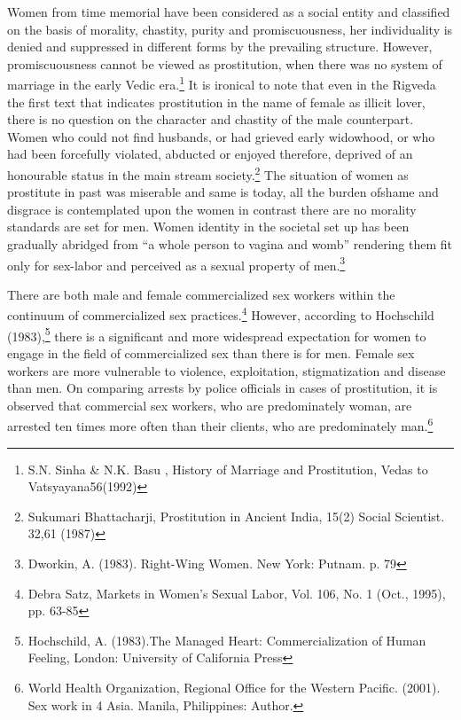 \begin{multicols}{2}
\vspace{-.15cm}


\vspace{-.1cm}

\noi
Women from time memorial have been considered as a social entity and classified on the basis
of morality, chastity, purity and promiscuousness, her individuality is denied and suppressed
in different forms by the prevailing structure. However, promiscuousness cannot be viewed as
prostitution, when there was no system of marriage in the early Vedic era.\footnote{S.N. Sinha \& N.K. Basu , History of Marriage and Prostitution, Vedas to Vatsyayana56(1992)} It is ironical to
note that even in the Rigveda the first text that indicates prostitution in the name of female as
illicit lover, there is no question on the character and chastity of the male counterpart. Women
who could not find husbands, or had grieved early widowhood, or who had been forcefully
violated, abducted or enjoyed therefore, deprived of an honourable status in the main stream
society.\footnote{Sukumari Bhattacharji, Prostitution in Ancient India, 15(2) Social Scientist. 32,61 (1987)} The situation of women as prostitute in past was miserable and same is today, all the
burden ofshame and disgrace is contemplated upon the women in contrast there are no morality
standards are set for men. Women identity in the societal set up has been gradually abridged
from “a whole person to vagina and womb” rendering them fit only for sex-labor and perceived
as a sexual property of men.\footnote{Dworkin, A. (1983). Right-Wing Women. New York: Putnam. p. 79}

\newpage

\noi
There are both male and female commercialized sex workers within the continuum of
commercialized sex practices.\footnote{Debra Satz, Markets in Women's Sexual Labor, Vol. 106, No. 1 (Oct., 1995), pp. 63-85} However, according to Hochschild (1983),\footnote{Hochschild, A. (1983).The Managed Heart: Commercialization of Human Feeling, London: University of
California Press} there is a significant and more widespread expectation for women to engage in the field of commercialized sex than there is for men. Female sex workers are more vulnerable to violence, exploitation, stigmatization and disease than men. On comparing arrests by police officials in cases of prostitution, it is observed that commercial sex workers, who are predominately woman, are arrested ten times more often than their clients, who are predominately man.\footnote{World Health Organization, Regional Office for the Western Pacific. (2001). Sex work in 4 Asia. Manila,
Philippines: Author.}


\end{multicols}
